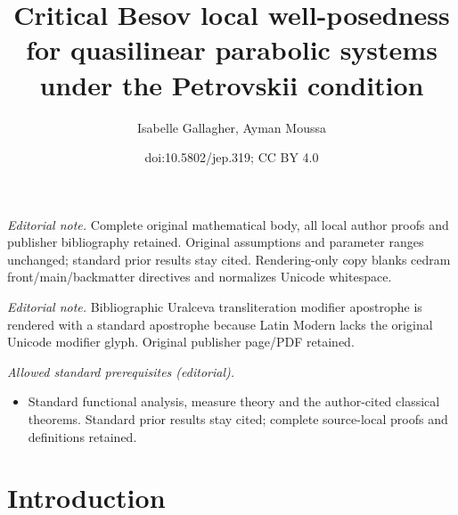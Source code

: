 \documentclass[10pt]{amsart}
\title{Critical Besov local well-posedness for quasilinear parabolic systems under the Petrovskii condition}
\author{Isabelle Gallagher, Ayman Moussa}
\date{doi:10.5802/jep.319; CC BY 4.0}
\theoremstyle{definition}
\begin{document}
\maketitle
\noindent\textit{Editorial note.} Complete original mathematical body, all local author proofs and publisher bibliography retained. Original assumptions and parameter ranges unchanged; standard prior results stay cited. Rendering-only copy blanks cedram front/main/backmatter directives and normalizes Unicode whitespace.\par\medskip
\noindent\textit{Editorial note.} Bibliographic Uralceva transliteration modifier apostrophe is rendered with a standard apostrophe because Latin Modern lacks the original Unicode modifier glyph. Original publisher page/PDF retained.\par\medskip
\noindent\textit{Allowed standard prerequisites (editorial).}\begin{itemize}
\item Standard functional analysis, measure theory and the author-cited classical theorems. Standard prior results stay cited; complete source-local proofs and definitions retained.
\end{itemize}\medskip
\tableofcontents



\section{Introduction}
\end{document}
